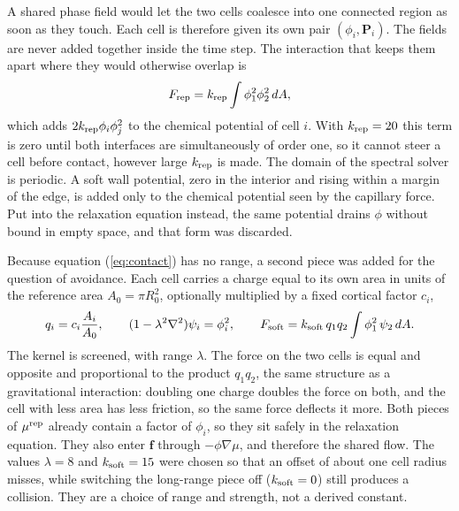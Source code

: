\documentclass[11pt]{article}
\begin{document}
A shared phase field would let the two cells coalesce into one connected region as soon as they touch. Each cell is therefore given its own pair $(\phi_{i},\mathbf{P}_{i})$. The fields are never added together inside the time step. The interaction that keeps them apart where they would otherwise overlap is
\begin{equation}\label{eq:contact}
F_{\rm rep}=k_{\rm rep}\int\phi_{1}^{2}\phi_{2}^{2}\,dA,
\end{equation}
which adds $2k_{\rm rep}\phi_{i}\phi_{j}^{2}$ to the chemical potential of cell $i$. With $k_{\rm rep}=20$ this term is zero until both interfaces are simultaneously of order one, so it cannot steer a cell before contact, however large $k_{\rm rep}$ is made. The domain of the spectral solver is periodic. A soft wall potential, zero in the interior and rising within a margin of the edge, is added only to the chemical potential seen by the capillary force. Put into the relaxation equation instead, the same potential drains $\phi$ without bound in empty space, and that form was discarded.

Because equation (\ref{eq:contact}) has no range, a second piece was added for the question of avoidance. Each cell carries a charge equal to its own area in units of the reference area $A_{0}=\pi R_{0}^{2}$, optionally multiplied by a fixed cortical factor $c_{i}$,
\begin{equation}\label{eq:soft}
q_{i}=c_{i}\frac{A_{i}}{A_{0}},\qquad
(1-\lambda^{2}\nabla^{2})\psi_{i}=\phi_{i}^{2},\qquad
F_{\rm soft}=k_{\rm soft}\,q_{1}q_{2}\int\phi_{1}^{2}\,\psi_{2}\,dA.
\end{equation}
The kernel is screened, with range $\lambda$. The force on the two cells is equal and opposite and proportional to the product $q_{1}q_{2}$, the same structure as a gravitational interaction: doubling one charge doubles the force on both, and the cell with less area has less friction, so the same force deflects it more. Both pieces of $\mu^{\rm rep}$ already contain a factor of $\phi_{i}$, so they sit safely in the relaxation equation. They also enter $\mathbf{f}$ through $-\phi\nabla\mu$, and therefore the shared flow. The values $\lambda=8$ and $k_{\rm soft}=15$ were chosen so that an offset of about one cell radius misses, while switching the long-range piece off ($k_{\rm soft}=0$) still produces a collision. They are a choice of range and strength, not a derived constant.
\end{document}
